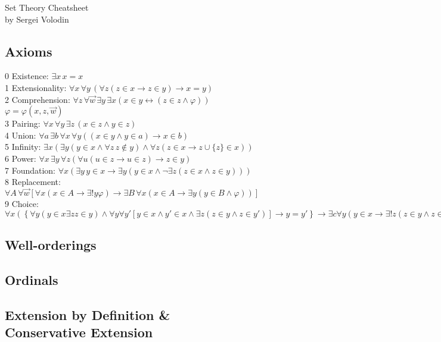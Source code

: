 \documentclass[twocolumn]{article}
\begin{document}
\begin{center}
	{\large Set Theory Cheatsheet}\\
	by Sergei Volodin
\end{center}
\subsection*{Axioms}
0 Existence: $\exists x\, x=x$\\
1 Extensionality: $\forall x\,\forall y\,\left(\forall z \left(z\in x\to z\in y\right)\to x=y \right)$\\
2 Comprehension: $\forall z\,\forall \vec{w}\,\exists y\,\exists x\left(x\in y\leftrightarrow \left(z\in z \wedge\varphi\right)\right)$\\
$\varphi=\varphi(x,z,\vec{w})$\\
3 Pairing: $\forall x\,\forall y\,\exists z\,\left(x\in z\wedge y\in z\right)$\\
4 Union: $\forall a\,\exists b\,\forall x\,\forall y\left((x\in y\wedge y\in a)\to x\in b\right)$\\
5 Infinity: $\exists x\left(\exists y(y\in x\wedge\forall z\,z\notin y)\wedge \forall z(z\in x\to z\cup \{z\}\in x)\right)$\\
6 Power: $\forall x\,\exists y\,\forall z\left(\forall u(u\in z\to u\in z)\to z\in y\right)$\\
7 Foundation: $\forall x\left(\exists y\,y\in x\to\exists y(y\in x\wedge \neg \exists z(z\in x\wedge z\in y))\right)$\\
8 Replacement: $\forall A\,\forall\vec{w}\left[\forall x(x\in A\to\exists !y\varphi)\to\exists B\,\forall x(x\in A\to \exists y(y\in B\wedge \varphi))\right]$\\
9 Choice: $\forall x\left(\left\{\forall y(y\in x\exists z z\in y)\wedge \forall y\forall y'\left[y\in x\wedge y'\in x\wedge \exists z (z\in y\wedge z\in y')\right]\to y=y'\right\}\to\exists c\forall y(y\in x\to\exists !z(z\in y\wedge z\in c))\right)$
\subsection*{Well-orderings}
\subsection*{Ordinals}
\subsection*{Extension by Definition \&\\ Conservative Extension}
\end{document}
